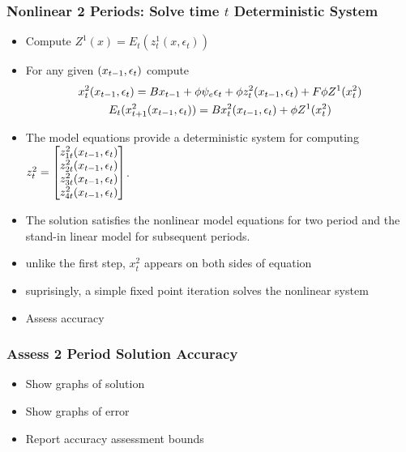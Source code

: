 \documentclass[letter]{beamer}
\begin{document}
\begin{frame}
  \frametitle{Nonlinear 2 Periods: Solve time $t$ Deterministic
    System }
{\small
  \begin{itemize}
  \item Compute $Z^1(x)= E_t(z^1_t(x,\epsilon_t))$
  \item For any given $(x_{t-1},\epsilon_t)$ 
compute
{\small
  \begin{gather}
    x_t^2(x_{t-1},\epsilon_t)=B x_{t-1} + \phi \psi_e\epsilon_t + \phi z^2_t(x_{t-1},\epsilon_t) + F \phi Z^1(x^2_t) \label{bothS}\\
    E_t(x^2_{t+1}(x_{t-1},\epsilon_t))=B x^2_{t}(x_{t-1},\epsilon_t)+ \phi Z^1(x^2_t)
  \end{gather}
}
\item The model equations provide a deterministic system  for computing $  z^2_t=\begin{bmatrix}
    z^2_{1t}(x_{t-1},\epsilon_t)\\
    z^2_{2t}(x_{t-1},\epsilon_t)\\
    z^2_{3t}(x_{t-1},\epsilon_t)\\
    z^2_{4t}(x_{t-1},\epsilon_t)
  \end{bmatrix}$.
\item The solution satisfies the nonlinear model equations for two 
period and the stand-in linear model for subsequent periods.
\item unlike the first step, $x^2_t$ appears on both sides of equation 
\item  suprisingly, a simple fixed point iteration solves the nonlinear system
\item Assess accuracy
  \end{itemize}
}
\end{frame}

\begin{frame}
  \frametitle{Assess 2 Period Solution Accuracy}
  \begin{itemize}
  \item Show graphs of solution
  \item Show graphs of error
  \item Report accuracy assessment bounds
  \end{itemize}
\end{frame}
\end{document}

